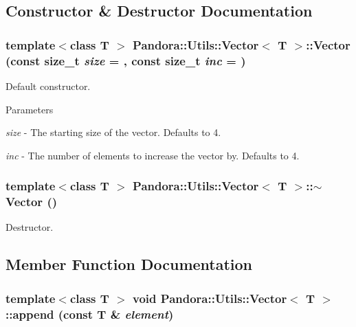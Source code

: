 \subsection{Constructor \& Destructor Documentation}
\hypertarget{classPandora_1_1Utils_1_1Vector_a08c4f102c57e56cabbca1c15e8c17122}{
\subsubsection[{Vector}]{\setlength{\rightskip}{0pt plus 5cm}template$<$class T $>$ {\bf Pandora::Utils::Vector}$<$ T $>$::{\bf Vector} (const size\_\-t {\em size} = {}, \/  const size\_\-t {\em inc} = {})}}
\label{classPandora_1_1Utils_1_1Vector_a08c4f102c57e56cabbca1c15e8c17122}


Default constructor. 
\begin{DoxyParams}{Parameters}
\item[{\em size}]-\/ The starting size of the vector. Defaults to 4. \item[{\em inc}]-\/ The number of elements to increase the vector by. Defaults to 4. \end{DoxyParams}
\hypertarget{classPandora_1_1Utils_1_1Vector_ab2688a6e46b857ad4756d21adadb0a20}{
\subsubsection[{$\sim$Vector}]{\setlength{\rightskip}{0pt plus 5cm}template$<$class T $>$ {\bf Pandora::Utils::Vector}$<$ T $>$::$\sim${\bf Vector} ()}}
\label{classPandora_1_1Utils_1_1Vector_ab2688a6e46b857ad4756d21adadb0a20}


Destructor. 

\subsection{Member Function Documentation}
\hypertarget{classPandora_1_1Utils_1_1Vector_a6c1c963c1d58b1e371a07c048c33cdca}{
\subsubsection[{append}]{\setlength{\rightskip}{0pt plus 5cm}template$<$class T $>$ void {\bf Pandora::Utils::Vector}$<$ T $>$::append (const T \& {\em element})}}
\label{classPandora_1_1Utils_1_1Vector_a6c1c963c1d58b1e371a07c048c33cdca}


